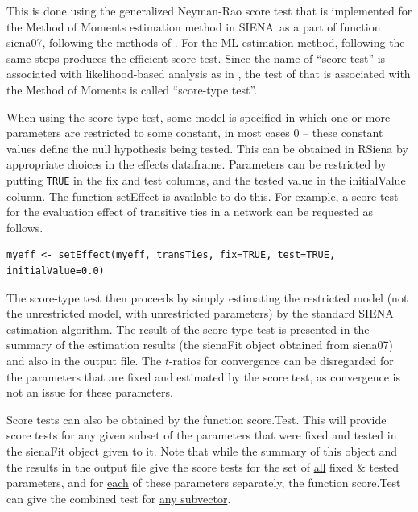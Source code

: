 \documentclass[a4paper,fleqn,11pt]{article}
\newcommand{\+}{\, + \,}
\newcommand{\sfn}[1]{\textsf{#1}}
\newcommand{\RS}{{\sf RSiena }}
\newcommand{\SI}{{\sf SIENA }}
\newcommand{\si}{{\sf SIENA}}
\begin{document}
This is done using the generalized Neyman-Rao score test
that is implemented for the Method of Moments estimation method
 in \si\ as a part of function \sfn{siena07}, following the methods
of \citet{Schweinberger12}.
For the ML estimation method,
following the same steps produces the \citet{Rao47} efficient score test.
Since the name of ``score test'' is associated with
likelihood-based analysis as in \citet{Rao47}, the test
of  \citet{Schweinberger12} that is associated with the Method of Moments
is called ``score-type test''.

When using the score-type test, some model
is specified in which one or more parameters are restricted to some
constant, in most cases $0$ -- these constant values
define the null hypothesis being tested.
This can be obtained in \RS by appropriate choices in the effects dataframe.
Parameters can be restricted by
putting \texttt{TRUE} in the \sfn{fix} and \sfn{test} columns, and
the tested value in the \sfn{initialValue} column.
The function \sfn{setEffect} is available to do this.
For example, a score test for the evaluation effect of transitive ties
in a network can be requested as follows.
\begin{verbatim}
myeff <- setEffect(myeff, transTies, fix=TRUE, test=TRUE, initialValue=0.0)
\end{verbatim}

The score-type test then
proceeds by simply estimating the restricted model (not the unrestricted model,
with unrestricted parameters) by the standard \SI estimation algorithm.
The result of the score-type test is presented in the \sfn{summary}
of the estimation results (the \sfn{sienaFit} object obtained from
\sfn{siena07}) and also in the output file.
The $t$-ratios for convergence can be disregarded for the parameters
that are fixed and estimated by the score test, as convergence is not an issue
for these parameters.

Score tests can also be obtained by the function \sfn{score.Test}.
This will provide score tests for any given subset of the parameters
that were fixed and tested in the \sfn{sienaFit} object given to it.
Note that while the  \sfn{summary} of this object and the results
in the output file give the score tests for the set of \underline{all}
fixed \& tested parameters, and for \underline{each} of these parameters
separately, the function \sfn{score.Test} can give the combined test
for \underline{any subvector}.
\end{document}
